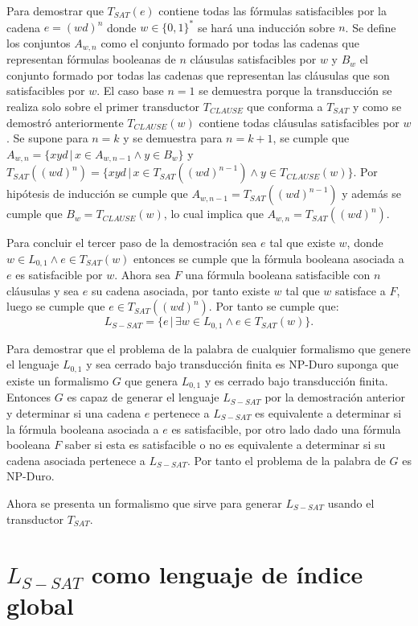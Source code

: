 \documentclass[12pt]{article}
\begin{document}
Para demostrar que $T_{SAT}(e)$ contiene todas las fórmulas satisfacibles por la cadena $e=(wd)^n$ donde $w\in\{0,1\}^*$
se hará una inducción sobre $n$. Se define los  conjuntos $A_{w,n}$ como el conjunto formado por todas las cadenas
que representan fórmulas booleanas de $n$ cláusulas satisfacibles por $w$ y $B_w$ el conjunto formado por todas las cadenas que representan las 
cláusulas que son satisfacibles por $w$. El caso base $n=1$ se demuestra 
porque la transducción se realiza solo sobre el primer transductor $T_{CLAUSE}$ que conforma a $T_{SAT}$ y como
se demostró anteriormente $T_{CLAUSE}(w)$ contiene todas cláusulas satisfacibles por $w$. 
Se supone para $n=k$ y se demuestra para $n=k+1$, se cumple que $A_{w,n}=\{xyd\,|\,x\in A_{w,n-1} \wedge y\in B_w\}$ y 
$T_{SAT}((wd)^n)=\{xyd\,|\,x\in T_{SAT}((wd)^{n-1}) \wedge y\in T_{CLAUSE}(w)\}$. Por hipótesis de inducción se cumple
que $A_{w,n-1}=T_{SAT}((wd)^{n-1})$ y además se cumple que $B_w=T_{CLAUSE}(w)$, lo cual implica que $A_{w,n}=T_{SAT}((wd)^n)$.

Para concluir el tercer paso de la demostración sea $e$ tal que existe $w$, donde $w \in L_{0,1} \wedge e \in T_{SAT}(w)$
entonces se cumple que la fórmula booleana asociada a $e$ es satisfacible por $w$. Ahora sea $F$ una fórmula booleana
satisfacible con $n$ cláusulas y sea $e$ su cadena asociada, por tanto existe $w$ tal que $w$ satisface a $F$, 
luego se cumple que $e\in T_{SAT}((wd)^n)$. Por tanto se cumple que:
$$L_{S-SAT} = \{e\,|\,\exists w \in L_{0,1} \wedge e \in T_{SAT}(w) \}.$$

Para demostrar que el problema de la palabra de cualquier formalismo que genere el lenguaje $L_{0,1}$ y sea cerrado bajo transducción
finita es NP-Duro suponga que existe un formalismo $G$ que genera $L_{0,1}$ y es cerrado bajo transducción finita.
Entonces $G$ es capaz de generar el lenguaje $L_{S-SAT}$ por la demostración anterior y determinar si una cadena $e$ pertenece a $L_{S-SAT}$ es 
equivalente a determinar si la fórmula booleana asociada a $e$ es satisfacible, por otro lado dado una fórmula booleana $F$
saber si esta es satisfacible o no es equivalente a determinar si su cadena asociada pertenece a $L_{S-SAT}$. Por tanto 
el problema de la palabra de $G$ es NP-Duro.

Ahora se presenta un formalismo que sirve para generar $L_{S-SAT}$ usando el transductor $T_{SAT}$.

\section{$L_{S-SAT}$ como lenguaje de índice global}
\end{document}

